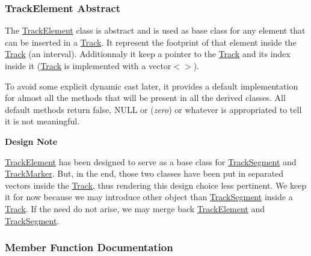 \hypertarget{classKite_1_1TrackElement_secTrackElementAbstract}{}\subsubsection{Track\+Element Abstract}\label{classKite_1_1TrackElement_secTrackElementAbstract}
The \mbox{\hyperlink{classKite_1_1TrackElement}{Track\+Element}} class is abstract and is used as base class for any element that can be inserted in a \mbox{\hyperlink{classKite_1_1Track}{Track}}. It represent the footprint of that element inside the \mbox{\hyperlink{classKite_1_1Track}{Track}} (an interval). Additionnaly it keep a pointer to the \mbox{\hyperlink{classKite_1_1Track}{Track}} and it\textquotesingle{}s index inside it (\mbox{\hyperlink{classKite_1_1Track}{Track}} is implemented with a {\ttfamily vector$<$$>$}).

To avoid some explicit dynamic cast later, it provides a default implementation for almost all the methods that will be present in all the derived classes. All default methods return {\ttfamily false}, {\ttfamily N\+U\+LL} or {} ({\itshape zero}) or whatever is appropriated to tell it is not meaningful.

{\bfseries Design Note}

\mbox{\hyperlink{classKite_1_1TrackElement}{Track\+Element}} has been designed to serve as a base class for \mbox{\hyperlink{classKite_1_1TrackSegment}{Track\+Segment}} and \mbox{\hyperlink{classKite_1_1TrackMarker}{Track\+Marker}}. But, in the end, those two classes have been put in separated vectors inside the \mbox{\hyperlink{classKite_1_1Track}{Track}}, thus rendering this design choice less pertinent. We keep it for now because we may introduce other object than \mbox{\hyperlink{classKite_1_1TrackSegment}{Track\+Segment}} inside a \mbox{\hyperlink{classKite_1_1Track}{Track}}. If the need do not arise, we may merge back \mbox{\hyperlink{classKite_1_1TrackElement}{Track\+Element}} and \mbox{\hyperlink{classKite_1_1TrackSegment}{Track\+Segment}}. 

\subsubsection{Member Function Documentation}
\mbox{\label{classKite_1_1TrackElement_a4648fa47d0870cf743436ff6a6239fd9}} 
